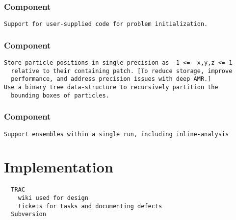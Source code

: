 \documentclass[14pt,letter]{article}
\begin{document}
\subsubsection{ Component}  \label{sss:parameters-component}

\begin{verbatim}
Support for user-supplied code for problem initialization.
\end{verbatim}

\subsubsection{ Component}  \label{sss:particles-component}

\begin{verbatim}
Store particle positions in single precision as -1 <=  x,y,z <= 1
  relative to their containing patch. [To reduce storage, improve
  performance, and address precision issues with deep AMR.]
Use a binary tree data-structure to recursively partition the
  bounding boxes of particles.
\end{verbatim}

\subsubsection{ Component}  \label{sss:simulation-component}

\begin{verbatim}
Support ensembles within a single run, including inline-analysis

\end{verbatim}

\section{Implementation} \label{s:implementation}

\begin{verbatim}
  TRAC
    wiki used for design
    tickets for tasks and documenting defects
  Subversion
\end{verbatim}
\end{document}
